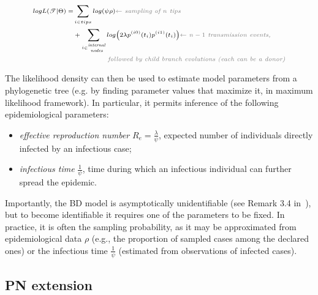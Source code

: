 \documentclass[a4paper,10pt]{article}
\begin{document}
\begin{equation}
\scriptsize
\begin{split}
log L(\mathscr{T}|\Theta) =  &\sum\limits_{i \in tips}  log(\psi \rho)  \textit{\color{gray} $\leftarrow$ sampling of $n$ tips} \\
 &+\sum\limits_{i \in \stackanchor{\tiny\textit{internal}}{\tiny\textit{nodes}}} log \big(2 \lambda p^{(i0)}(t_i)p^{(i1)}(t_i)\big)   \textit{\color{gray} $\leftarrow$ $n - 1$ transmission events,}\\
 & ~~~~~~~~~~~~~~~\textit{\color{gray} followed by child branch evolutions (each can be a donor)}  \label{eq:mtbd_tree_likelihood}
\end{split}
\end{equation}

The likelihood density can then be used to estimate model parameters from a phylogenetic tree (e.g. by finding parameter values that maximize it, in maximum likelihood framework). In particular, it permits inference of the following epidemiological parameters: 

\begin{itemize}
\item \textit{effective reproduction number} $R_e = \frac{\lambda}{\psi}$, expected number of individuals directly infected by an infectious case;
\item \textit{infectious time} $\frac{1}{\psi}$, time during which an infectious individual can further spread the epidemic.
\end{itemize} 

Importantly, the BD model is asymptotically unidentifiable (see Remark 3.4 in~\citep{Stadler2009}), but to become identifiable it requires one of the parameters to be fixed. In practice, it is often the sampling probability, as it may be approximated from epidemiological data $\rho$ (e.g., the proportion of sampled cases among the declared ones) or the infectious time $\frac{1}{\psi}$ (estimated from observations of infected cases). 


\subsection{PN extension}
\end{document}
